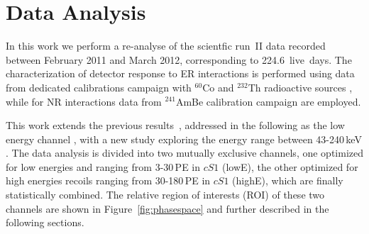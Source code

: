 \section{Data Analysis}
\label{sec:Analysis}
In this work we perform a re-analyse of the scientfic run~II data recorded between February 2011 and March 2012, 
corresponding to 224.6~live~days. The characterization of  detector response to ER interactions is performed using data from dedicated calibrations campaign with $^{60}$Co and $^{232}$Th radioactive sources , while for NR interactions data from $^{241}$AmBe calibration campaign are employed.


This work extends the previous results~\cite{xe100_run10_si,xe100_run_combination}, addressed in the following as the low energy channel , with a new study exploring the energy range between 43-240\,keV . 
The data analysis is divided into two mutually exclusive channels, one optimized for low energies and ranging from 3-30\,PE in $cS1$ (lowE), the other optimized for high energies recoils
ranging from 30-180\,PE in $cS1$ (highE), which are finally statistically combined. 
The relative region of interests (ROI) of these two channels are shown in Figure~\ref{fig:phasespace} and further described in the following sections. 




